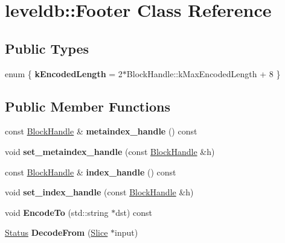 \hypertarget{classleveldb_1_1_footer}{}\section{leveldb\+::Footer Class Reference}
\label{classleveldb_1_1_footer}
\subsection*{Public Types}
\begin{DoxyCompactItemize}
\item 
\mbox{\label{classleveldb_1_1_footer_abc42aed79d524b414252b50e36f5d4da}} 
enum \{ {\bfseries k\+Encoded\+Length} = 2$\ast$\+Block\+Handle\+::k\+Max\+Encoded\+Length + 8
 \}
\end{DoxyCompactItemize}
\subsection*{Public Member Functions}
\begin{DoxyCompactItemize}
\item 
\mbox{\label{classleveldb_1_1_footer_a996dd331d9c58d855522f990fbbf4ae1}} 
const \mbox{\hyperlink{classleveldb_1_1_block_handle}{Block\+Handle}} \& {\bfseries metaindex\+\_\+handle} () const
\item 
\mbox{\label{classleveldb_1_1_footer_ac937207010f61550c703b2d732422566}} 
void {\bfseries set\+\_\+metaindex\+\_\+handle} (const \mbox{\hyperlink{classleveldb_1_1_block_handle}{Block\+Handle}} \&h)
\item 
\mbox{\label{classleveldb_1_1_footer_a4e7e2baf2b79fe2b6d15d147a8bae57a}} 
const \mbox{\hyperlink{classleveldb_1_1_block_handle}{Block\+Handle}} \& {\bfseries index\+\_\+handle} () const
\item 
\mbox{\label{classleveldb_1_1_footer_ae2f4be5947f5e4983a160d6d01edea68}} 
void {\bfseries set\+\_\+index\+\_\+handle} (const \mbox{\hyperlink{classleveldb_1_1_block_handle}{Block\+Handle}} \&h)
\item 
\mbox{\label{classleveldb_1_1_footer_a13267dee115f0281a5a5b405714d3948}} 
void {\bfseries Encode\+To} (std\+::string $\ast$dst) const
\item 
\mbox{\label{classleveldb_1_1_footer_a3cbcb311694e4cf410358f97d53d94e3}} 
\mbox{\hyperlink{classleveldb_1_1_status}{Status}} {\bfseries Decode\+From} (\mbox{\hyperlink{classleveldb_1_1_slice}{Slice}} $\ast$input)
\end{DoxyCompactItemize}


